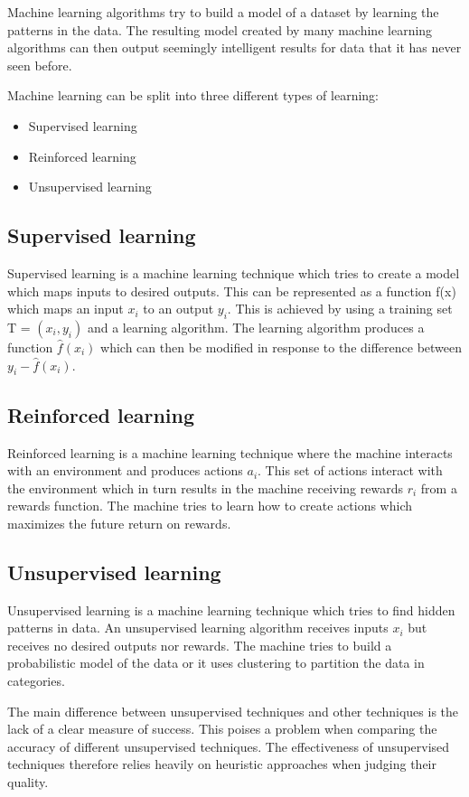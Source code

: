 Machine learning algorithms try to build a model of a dataset by learning the patterns in the data.
The resulting model created by many machine learning algorithms can then output seemingly intelligent results for data that it has never seen before.

Machine learning can be split into three different types of learning:
\begin{itemize}
    \item Supervised learning
    \item Reinforced learning
    \item Unsupervised learning
\end{itemize}

\subsection{Supervised learning}
Supervised learning is a machine learning technique which tries to create a model which maps inputs to desired outputs.
This can be represented as a function f(x) which maps an input \(x_i\) to an output \(y_i\).
This is achieved by using a training set T = \((x_i, y_i)\) and a learning algorithm.
The learning algorithm produces a function \(\hat{f}(x_i)\) which can then be modified in response to the difference between \(y_i - \hat{f}(x_i)\).

\subsection{Reinforced learning}
Reinforced learning is a machine learning technique where the machine interacts with an environment and produces actions \(a_i\).
This set of actions interact with the environment which in turn results in the machine receiving rewards \(r_i\) from a rewards function.
The machine tries to learn how to create actions which maximizes the future return on rewards.

\subsection{Unsupervised learning}
Unsupervised learning is a machine learning technique which tries to find hidden patterns in data.
An unsupervised learning algorithm receives inputs \(x_i\) but receives no desired outputs nor rewards.
The machine tries to build a probabilistic model of the data or it uses clustering to partition the data in categories.

The main difference between unsupervised techniques and other techniques is the lack of a clear measure of success.
This poises a problem when comparing the accuracy of different unsupervised techniques.
The effectiveness of unsupervised techniques therefore relies heavily on heuristic approaches when judging their quality.

